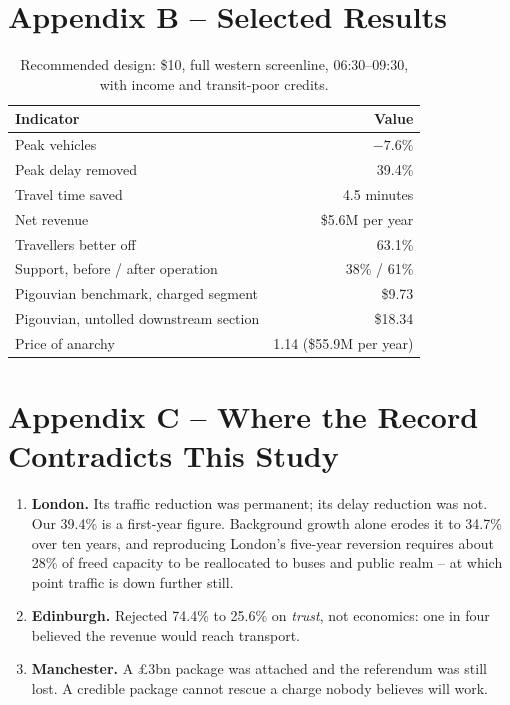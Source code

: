 \documentclass[11pt,letterpaper]{article}
\begin{document}
\begin{singlespace}
\section*{Appendix B -- Selected Results}
\begin{table}[h]
\centering
\small
\caption*{\normalfont\small Recommended design: \$10, full western screenline,
06:30--09:30, with income and transit-poor credits.}
\begin{tabular}{lr}
\toprule
\textbf{Indicator} & \textbf{Value} \\
\midrule
Peak vehicles & $-7.6\%$ \\
Peak delay removed & 39.4\% \\
Travel time saved & 4.5 minutes \\
Net revenue & \$5.6M per year \\
Travellers better off & 63.1\% \\
Support, before / after operation & 38\% / 61\% \\
Pigouvian benchmark, charged segment & \$9.73 \\
Pigouvian, untolled downstream section & \$18.34 \\
Price of anarchy & 1.14 (\$55.9M per year) \\
\bottomrule
\end{tabular}
\end{table}

\section*{Appendix C -- Where the Record Contradicts This Study}
\begin{enumerate}[leftmargin=*,itemsep=1pt]
\item \textbf{London.} Its traffic reduction was permanent; its delay reduction
was not. Our 39.4\% is a first-year figure. Background growth alone erodes it to
34.7\% over ten years, and reproducing London's five-year reversion requires
about 28\% of freed capacity to be reallocated to buses and public realm --
at which point traffic is down further still.
\item \textbf{Edinburgh.} Rejected 74.4\% to 25.6\% on \emph{trust}, not
economics: one in four believed the revenue would reach transport.
\item \textbf{Manchester.} A \pounds3bn package was attached and the referendum
was still lost. A credible package cannot rescue a charge nobody believes will
work.
\end{enumerate}
\end{singlespace}
\end{document}
